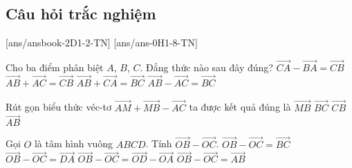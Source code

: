 \subsection{Câu hỏi trắc nghiệm}
[ans/ansbook-2D1-2-TN]
[ans/ans-0H1-8-TN]
\begin{ex}%
	Cho ba điểm phân biệt $A$, $B$, $C$. Đẳng thức nào sau đây đúng?
	\choice
	{\True $\overrightarrow{CA} - \overrightarrow{BA} = \overrightarrow{CB}$}
	{$\overrightarrow{AB} + \overrightarrow{AC} = \overrightarrow{CB}$}
	{$\overrightarrow{AB} + \overrightarrow{CA} = \overrightarrow{BC}$}
	{$\overrightarrow{AB} - \overrightarrow{AC} = \overrightarrow{BC}$}
\end{ex}

\begin{ex}%
	Rút gọn biểu thức véc-tơ $\vec{AM}+\vec{MB}-\vec{AC}$ ta được kết quả đúng là
	\choice
	{$\vec{MB}$}
	{$\vec{BC}$}
	{\True $\vec{CB}$}
	{$\vec{AB}$}
\end{ex}
\begin{ex}%
	Gọi $O$ là tâm hình vuông $ABCD$. Tính $\overrightarrow{OB}-\overrightarrow{OC}$.
	\choice
	{$\overrightarrow{OB}-\overrightarrow{OC}=\overrightarrow{BC}$}
	{\True $\overrightarrow{OB}-\overrightarrow{OC}=\overrightarrow{DA}$}
	{$\overrightarrow{OB}-\overrightarrow{OC}=\overrightarrow{OD}-\overrightarrow{OA}$}
	{$\overrightarrow{OB}-\overrightarrow{OC}=\overrightarrow{AB}$}
\end{ex}


